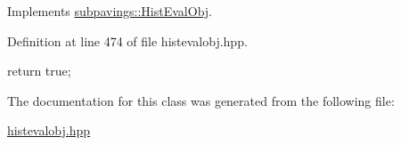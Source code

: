 \-Implements \hyperlink{classsubpavings_1_1HistEvalObj_a56a8d23818446775d7e4ef24755425e9}{subpavings\-::\-Hist\-Eval\-Obj}.



\-Definition at line 474 of file histevalobj.\-hpp.


\begin{DoxyCode}
    { return true; }
\end{DoxyCode}


\-The documentation for this class was generated from the following file\-:\begin{DoxyCompactItemize}
\item 
\hyperlink{histevalobj_8hpp}{histevalobj.\-hpp}\end{DoxyCompactItemize}
